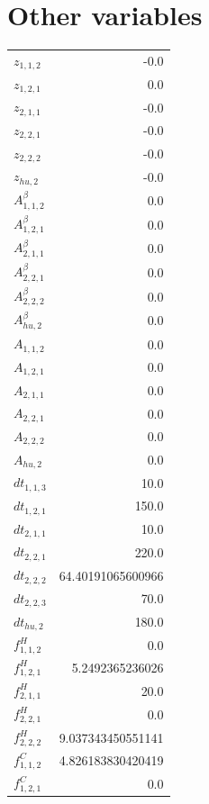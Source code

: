 \documentclass{article}%
\makeatletter
\let\mcnewpage=\newpage%
\newcommand{\TrickSupertabularIntoMulticols}{%
\renewcommand\newpage{%
\if@firstcolumn%
\hrule width\linewidth height0pt%
\columnbreak%
\else%
\mcnewpage%
\fi%
}%
}%
\makeatother
\begin{document}
\section{Other variables}%
\thispagestyle{plain}%
\begin{multicols*}{3}%
\TrickSupertabularIntoMulticols%
%
\begin{supertabular}{lr}%
	$z_{1,1,2}$ & -0.0 \\%
	$z_{1,2,1}$ & 0.0 \\%
	$z_{2,1,1}$ & -0.0 \\%
	$z_{2,2,1}$ & -0.0 \\%
	$z_{2,2,2}$ & -0.0 \\%
	$z_{hu,2}$ & -0.0 \\%
	$A_{1,1,2}^{\beta}$ & 0.0 \\%
	$A_{1,2,1}^{\beta}$ & 0.0 \\%
	$A_{2,1,1}^{\beta}$ & 0.0 \\%
	$A_{2,2,1}^{\beta}$ & 0.0 \\%
	$A_{2,2,2}^{\beta}$ & 0.0 \\%
	$A_{hu,2}^{\beta}$ & 0.0 \\%
	$A_{1,1,2}$ & 0.0 \\%
	$A_{1,2,1}$ & 0.0 \\%
	$A_{2,1,1}$ & 0.0 \\%
	$A_{2,2,1}$ & 0.0 \\%
	$A_{2,2,2}$ & 0.0 \\%
	$A_{hu,2}$ & 0.0 \\%
	$dt_{1,1,3}$ & 10.0 \\%
	$dt_{1,2,1}$ & 150.0 \\%
	$dt_{2,1,1}$ & 10.0 \\%
	$dt_{2,2,1}$ & 220.0 \\%
	$dt_{2,2,2}$ & 64.40191065600966 \\%
	$dt_{2,2,3}$ & 70.0 \\%
	$dt_{hu,2}$ & 180.0 \\%
	$f_{1,1,2}^{H}$ & 0.0 \\%
	$f_{1,2,1}^{H}$ & 5.2492365236026 \\%
	$f_{2,1,1}^{H}$ & 20.0 \\%
	$f_{2,2,1}^{H}$ & 0.0 \\%
	$f_{2,2,2}^{H}$ & 9.037343450551141 \\%
	$f_{1,1,2}^{C}$ & 4.826183830420419 \\%
	$f_{1,2,1}^{C}$ & 0.0 \\%

\end{supertabular}
\end{multicols*}
\end{document}

